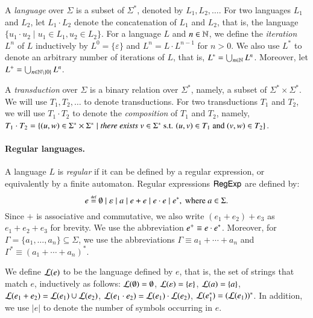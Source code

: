 A \emph{language} over $\Sigma$ is a subset of $\Sigma^*$, denoted by  $L_1, L_2, \dots$. For two languages $L_1$ and $L_2$, let $L_1 \cdot L_2$ denote the concatenation of $L_1$ and $L_2$, that is, the language $\{u_1 \cdot u_2 \mid u_1 \in L_1, u_2 \in L_2\}$. 
For a language $L$ and $n \in \mathbb{N}$, we define the \emph{iteration} $L^n$ of $L$  inductively by $L^0=\{\varepsilon\}$ and $L^{n} =L \cdot L^{n-1}$ for $n > 0$. We also use $L^*$ to denote an arbitrary number of iterations of $L$, that is, $L^* = \bigcup _{n \in \mathbb{N}} L^n$. Moreover, let $L^+ = \bigcup _{n \in \mathbb{N} \setminus \{0\}} L^n$. 

A \emph{transduction} over $\Sigma$ is a binary relation over $\Sigma^*$, namely, a subset of $\Sigma^* \times \Sigma^*$. We will use $T_1, T_2,\ldots$ to denote transductions. For two transductions $T_1$ and $T_2$, we will use $T_1 \cdot T_2$ to denote the \emph{composition} of $T_1$ and $T_2$, namely, $T_1 \cdot T_2 = \{(u, w) \in \Sigma^* \times \Sigma^* \mid \emph{there exists } v \in \Sigma^* \mbox{ s.t. } (u,v) \in T_1 \mbox{ and } (v,w) \in T_2\}$.

\paragraph*{Regular languages.}
A language $L$ is \emph{regular} if it can be defined by a regular expression, or equivalently by a finite automaton.  
Regular expressions ${\sf RegExp}$ are defined by:
%
	\[e \eqdef \emptyset \mid \varepsilon \mid a \mid e + e \mid e \concat e \mid e^*, \mbox{ where } a \in \Sigma. \]
%
Since $+$ is associative and commutative, we also write $(e_1 + e_2) + e_3$ as $e_1 + e_2 + e_3$ for brevity. We use the abbreviation $e^+ \equiv e \cdot e^*$. Moreover, for $\Gamma = \{a_1, \ldots, a_n\}\subseteq \Sigma$, we use the abbreviations $\Gamma \equiv a_1 + \cdots + a_n$ and $\Gamma^\ast \equiv (a_1 + \cdots + a_n)^\ast$. 

We define $\mathcal{L}(e)$ to be the language defined by $e$, that is, the set of strings that match $e$, inductively as follows: $\mathcal{L}(\emptyset) =\emptyset$,
$\mathcal{L}(\varepsilon) =\{\varepsilon\}$,
%
$\mathcal{L}(a)= \{a\}$,
%
$\mathcal{L}(e_1 + e_2) = \mathcal{L}(e_1) \cup \mathcal{L}(e_2)$,
%
$\mathcal{L}(e_1 \cdot e_2) = \mathcal{L}(e_1) \cdot \mathcal{L}(e_2)$,
%
$\mathcal{L}(e_1^*)=(\mathcal{L}(e_1))^*$.
In addition, we use $|e|$ to denote the number of symbols occurring in $e$.

